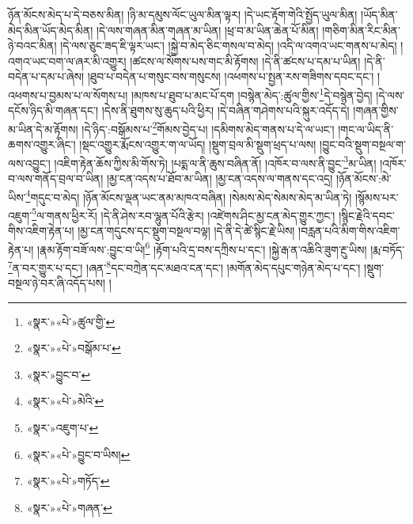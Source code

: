 ཉོན་མོངས་མེད་པ་དེ་བཅས་མིན། །ཉི་མ་དམུས་ལོང་ཡུལ་མིན་ལྟར། །དེ་ཡང་རྟོག་གེའི་སྤྱོད་ཡུལ་མིན། །ཡོད་མིན་མེད་མིན་ཡོད་མེད་མིན། །དེ་ལས་གཞན་མིན་གཞན་མ་ཡིན། །ཕྲ་བ་མ་ཡིན་ཆེན་པོ་མིན། །གཅིག་མིན་རིང་མིན་ཉེ་བའང་མིན། །དེ་ལས་ཅུང་ཟད་ཇི་ལྟར་ཡང་། །སྐྱེ་བ་མེད་ཅིང་གསལ་བ་མེད། །འདི་ལ་འགའ་ཡང་གནས་པ་མེད། །འགའ་ཡང་བག་ལ་ཞར་མི་འགྱུར། །ཚངས་ལ་སོགས་པས་གང་མི་རྟོགས། །དེ་ནི་ཚངས་པ་དམ་པ་ཡིན། །དེ་ནི་བདེན་པ་དམ་པ་ཞེས། །ཐུབ་པ་བདེན་པ་གསུང་བས་གསུངས། །འཕགས་པ་སྤྱན་རས་གཟིགས་དབང་དང་། །འཕགས་པ་བྱམས་པ་ལ་སོགས་པ། །མཁས་པ་ཐུབ་པ་མང་པོ་དག །བསྙེན་མེད་:ཚུལ་གྱིས་\footnote{«སྣར་»«པེ་»ཚུལ་གྱི་}དེ་བསྙེན་བྱེད། །དེ་ལས་དངོས་ཉིད་མི་གཞན་དང་། །དེས་ནི་ཐུགས་སུ་ཆུད་པའི་ཕྱིར། །དེ་བཞིན་གཤེགས་པའི་སྐུར་འདོད་དེ། །གཞན་གྱིས་མ་ཡིན་དེ་མ་རྟོགས། །དེ་ཉིད་:བསྒོམས་པ་\footnote{«སྣར་»«པེ་»བསྒོམ་པ་}གོམས་བྱེད་པ། །དམིགས་མེད་གནས་པ་དེ་ལ་ཡང་། །གང་ལ་ཡིད་ནི་ཆགས་འགྱུར་ཞིང་། །སྡང་འགྱུར་རྨོངས་འགྱུར་ག་ལ་ཡོད། །སྡུག་བྲལ་མི་སྡུག་ཕྲད་པ་ལས། །བྱུང་བའི་སྡུག་བསྔལ་ག་ལས་འབྱུང་། །འཇིག་རྟེན་ཆོས་ཀྱིས་མི་གོས་ཏེ། །པདྨ་ལ་ནི་ཆུས་བཞིན་ནོ། །འཁོར་བ་ལས་ནི་བྱུང་\footnote{«སྣར་»བྱུང་བ་}མ་ཡིན། །འཁོར་བ་ལས་གནོད་བྲལ་བ་ཡིན། །མྱ་ངན་འདས་པ་ཐོབ་མ་ཡིན། །མྱ་ངན་འདས་ལ་གནས་དང་འདྲ། །ཉོན་མོངས་:མེ་ཡིས་\footnote{«སྣར་»«པེ་»མེའི་}གདུང་བ་མེད། །ཉོན་མོངས་ལྡན་ཡང་ནམ་མཁའ་བཞིན། །སེམས་མེད་སེམས་མེད་མ་ཡིན་ཏེ། །སྙོམས་པར་འཇུག་\footnote{«སྣར་»འཇུག་པ་}ལ་གནས་ཕྱིར་རོ། །དེ་ནི་ཤེས་རབ་ལྷུན་པོའི་རྩེར། །འཛེགས་ཤིང་མྱ་ངན་མེད་གྱུར་ཀྱང་། །སྙིང་རྗེའི་དབང་གིས་འཇིག་རྟེན་པ། །མྱ་ངན་གདུངས་དང་སྡུག་བསྔལ་བལྟ། །དེ་ནི་དེ་ཚེ་སྙིང་རྗེ་ཡིས། །བརླན་པའི་མིག་གིས་འཇིག་རྟེན་པ། །རྣམ་རྟོག་བཟོ་ལས་:བྱུང་བ་ཡི།\footnote{«སྣར་»«པེ་»བྱུང་བ་ཡིས།} །རྟོག་པའི་དྲ་བས་དཀྲིས་པ་དང་། །སྐྱེ་རྒ་ན་འཆིའི་ཟུག་རྔུ་ཡིས། །རྨ་བཏོད་\footnote{«སྣར་»«པེ་»གཏོད་}ན་བར་གྱུར་པ་དང་། །ཞན་\footnote{«སྣར་»«པེ་»གཞན་}དང་བཀྲེན་དང་མཐའ་ངན་དང་། །མགོན་མེད་དཔུང་གཉེན་མེད་པ་དང་། །སྡུག་བསྔལ་ཉེ་བར་ཞི་འདོད་པས། །
